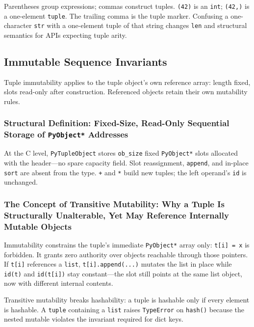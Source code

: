 \documentclass[a4paper,twoside]{report}
\begin{document}
Parentheses group expressions; commas construct tuples. \texttt{(42)} is an \texttt{int}; \texttt{(42,)} is a one-element \texttt{tuple}. The trailing comma is the tuple marker. Confusing a one-character \texttt{str} with a one-element tuple of that string changes \texttt{len} and structural semantics for APIs expecting tuple arity.


\subsection{Immutable Sequence Invariants}

Tuple immutability applies to the tuple object's own reference array: length fixed, slots read-only after construction. Referenced objects retain their own mutability rules.

\subsubsection{Structural Definition: Fixed-Size, Read-Only Sequential Storage of \texttt{PyObject*} Addresses}

At the C level, \texttt{PyTupleObject} stores \texttt{ob\_size} fixed \texttt{PyObject*} slots allocated with the header---no spare capacity field. Slot reassignment, \texttt{append}, and in-place \texttt{sort} are absent from the type. \texttt{+} and \texttt{*} build new tuples; the left operand's \texttt{id} is unchanged.

\subsubsection{The Concept of Transitive Mutability: Why a Tuple Is Structurally Unalterable, Yet May Reference Internally Mutable Objects}

Immutability constrains the tuple's immediate \texttt{PyObject*} array only: \texttt{t[i] = x} is forbidden. It grants zero authority over objects reachable through those pointers. If \texttt{t[i]} references a \texttt{list}, \texttt{t[i].append(...)} mutates the list in place while \texttt{id(t)} and \texttt{id(t[i])} stay constant---the slot still points at the same list object, now with different internal contents.

Transitive mutability breaks hashability: a tuple is hashable only if every element is hashable. A \texttt{tuple} containing a \texttt{list} raises \texttt{TypeError} on \texttt{hash()} because the nested mutable violates the invariant required for dict keys.
\end{document}
